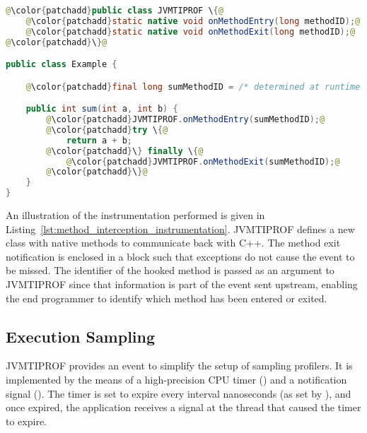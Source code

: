 \medskip
\begin{lstlisting}[language=Java,frame=tb,escapechar=@,captionpos=b,caption=Example instrumentation applied by method interception. Instrumented code is in green. The \code{sum} method is modified such that JVMTIPROF is notified about entries and exits on it.,label=lst:method_interception_instrumentation]
@\color{patchadd}public class JVMTIPROF \{@
    @\color{patchadd}static native void onMethodEntry(long methodID);@
    @\color{patchadd}static native void onMethodExit(long methodID);@
@\color{patchadd}\}@

public class Example {

    @\color{patchadd}final long sumMethodID = /* determined at runtime */;@

    public int sum(int a, int b) {
        @\color{patchadd}JVMTIPROF.onMethodEntry(sumMethodID);@
        @\color{patchadd}try \{@
            return a + b;
        @\color{patchadd}\} finally \{@
            @\color{patchadd}JVMTIPROF.onMethodExit(sumMethodID);@
        @\color{patchadd}\}@
    }
}
\end{lstlisting}

An illustration of the instrumentation performed is given in Listing~\ref{lst:method_interception_instrumentation}. JVMTIPROF defines a new class with native methods to communicate back with C++. The method exit notification is enclosed in a  block such that exceptions do not cause the event to be missed. The identifier of the hooked method is passed as an argument to JVMTIPROF since that information is part of the event sent upstream, enabling the end programmer to identify which method has been entered or exited.





\subsection{Execution Sampling}

JVMTIPROF provides an event to simplify the setup of sampling profilers. It is implemented by the means of a high-precision CPU timer () and a notification signal (). The timer is set to expire every interval nanoseconds (as set by ), and once expired, the application receives a signal at the thread that caused the timer to expire.

